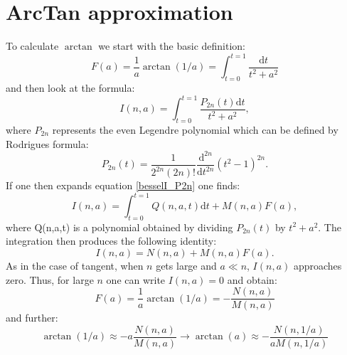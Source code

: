 \documentclass[openany, longbibliography,slovene,a4paper,12pt]{article}
\newcommand{\dif}{\mathrm{d}}
\begin{document}
\section{ArcTan approximation}
To calculate $\arctan$ we start with the basic definition:
\begin{equation}
  F(a)=\frac{1}{a}\arctan(1/a)=\int_{t=0}^{t=1}\frac{\dif t}{t^2+a^2}
  \end{equation}
  and then look at the formula:
  \begin{equation} \label{besselI_P2n}
    I(n,a)=\int_{t=0}^{t=1}\frac{P_{2n}(t)\dif t}{t^2+a^2},
  \end{equation}
  where $P_{2n}$ represents the even Legendre polynomial which can be defined by
  Rodrigues formula:
  \begin{equation}
    P_{2n}(t)=\frac{1}{2^{2n}(2n)!}\frac{\dif^{2n}}{\dif t^{2n}}(t^2-1)^{2n}.
  \end{equation}
  If one then expands equation \ref{besselI_P2n} one finds:
  \begin{equation}
    I(n,a)=\int_{t=0}^{t=1}Q(n,a,t)\dif t+ M(n,a)F(a),
  \end{equation}
  where Q(n,a,t) is a polynomial obtained by dividing $P_{2n}(t)$ by $t^2+a^2$.
  The integration then produces the following identity:
  \begin{equation}
    I(n,a)=N(n,a)+M(n,a)F(a).
  \end{equation}
  As in the case of tangent, when $n$ gets large and $a \ll n$, $I(n,a)$
  approaches zero. Thus, for large $n$ one can write $I(n,a)=0$ and obtain:
  \begin{equation}
    F(a)=\frac{1}{a}\arctan(1/a)=-\frac{N(n,a)}{M(n,a)}
    \end{equation}
    and further:
    \begin{equation}
      \arctan(1/a)\approx -a\frac{N(n,a)}{M(n,a)} \rightarrow  \arctan(a)\approx -\frac{N(n,1/a)}{aM(n,1/a)}
      \end{equation}
  
\end{document}
